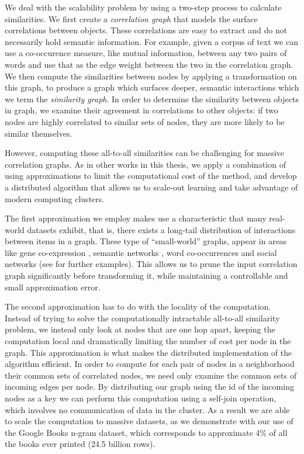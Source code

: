 We deal with the scalability problem by using a two-step process to calculate similarities.
We first create a \emph{correlation graph} that models the surface correlations between objects.
These correlations are easy to extract and do not necessarily hold semantic information.
For example,
given a corpus of text we can use a
co-occurence measure, like mutual information, between any two pairs of
words and use that as the edge weight between the two in the correlation graph.
We then compute the similarities between nodes by applying a transformation on this graph, to produce a graph which surfaces deeper,
semantic interactions which we term the \emph{similarity graph}.
In order to determine the similarity between objects in graph, we examine
their agreement in correlations to other objects: if two nodes are highly
correlated to similar sets of nodes, they are more likely to be similar themselves.

However, computing these all-to-all similarities can be challenging for massive
correlation graphs.
As in other works in this thesis, we apply a combination of using approximations to limit
the computational cost of the method, and develop a distributed algorithm that allows
us to scale-out learning and take advantage of modern computing clusters.

The first approximation we employ makes use a characteristic that many real-world datasets exhibit,
that is, there exists a long-tail distribution of interactions between items in a graph. These type
of ``small-world'' graphs, appear in areas like gene co-expression \cite{gene-small-world}, semantic networks \cite{semantic-small-world},
word co-occurrences \cite{words-small-world} and social networks (see \cite{barabasi-small-world} for further
examples).
This allows us to prune the input correlation graph significantly before transforming it,
while maintaining a controllable and small approximation error.

The second approximation has to do with the locality of the computation. Instead of trying
to solve the computationally intractable all-to-all similarity problem, we instead only look at
nodes that are one hop apart, keeping the computation local and dramatically limiting the number of
cost per node in the graph.
This approximation is what makes the distributed implementation of the algorithm efficient.
In order to compute for each pair of nodes in a neighborhood their common sets of correlated nodes,
we need only examine the common sets of incoming edges per node. By distributing our graph
using the id of the incoming nodes as a key we can perform this computation using a
self-join operation, which involves no communication of data in the cluster. As a result
we are able to scale the computation to massive datasets, as we demonstrate with our use of the
Google Books n-gram dataset, which corresponds to approximate 4\% of all the books ever
printed \cite{ngrams} (24.5 billion rows).

